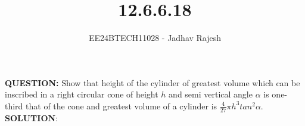 \documentclass[journal]{IEEEtran}
\begin{document}

\vspace{3cm}
\title{12.6.6.18}
\author{EE24BTECH11028 - Jadhav Rajesh}
{\let\newpage\relax\maketitle}

\renewcommand{\thefigure}{\theenumi}
\renewcommand{\thetable}{\theenumi}
\setlength{\intextsep}{10pt} %


\renewcommand{\thetable}{\theenumi}
 \textbf{QUESTION:} Show that height of the cylinder of greatest volume which can be inscribed in a right circular cone of height $h$ and semi vertical angle $\alpha$ is one-third that of the cone and greatest volume of a cylinder is $\frac{4}{27}\pi h^{3} tan^{2} \alpha$.\\
 
 \textbf{SOLUTION}: \\
 
\end{document}
